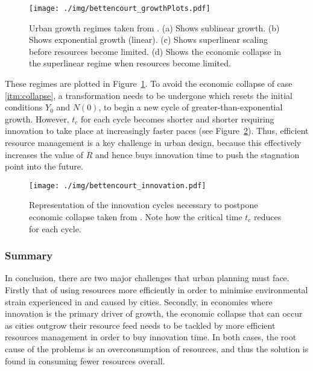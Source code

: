 \begin{figure}[h!]
	\centering
	\texttt{[image: ./img/bettencourt\_growthPlots.pdf]} 
	\caption{Urban growth regimes taken from \citet{Bettencourt2007}. (a) Shows sublinear growth. (b) Shows exponential growth (linear). (c) Shows superlinear scaling before resources become limited. (d) Shows the economic collapse in the superlinear regime when resources become limited.} \label{fig:bettencourt_growth}
\end{figure}
These regimes are plotted in Figure~\ref{fig:bettencourt_growth}. To avoid the economic collapse of case \eqref{itm:collapse}, a transformation needs to be undergone which resets the initial conditions $Y_0$ and $N(0)$, to begin a new cycle of greater-than-exponential growth. However, $t_c$ for each cycle becomes shorter and shorter requiring innovation to take place at increasingly faster paces (see Figure~\ref{fig:bettencourt_innovation}). Thus, efficient resource management is a key challenge in urban design, because this effectively increases the value of $R$ and hence buys innovation time to push the stagnation point into the future.

\begin{figure}[h!]
	\centering
	\texttt{[image: ./img/bettencourt\_innovation.pdf]} 
	\caption{Representation of the innovation cycles necessary to postpone economic collapse taken from \citet{Bettencourt2007}. Note how the critical time $t_c$ reduces for each cycle.} \label{fig:bettencourt_innovation}
\end{figure}

\subsubsection*{Summary}
In conclusion, there are two major challenges that urban planning must face. Firstly that of using resources more efficiently in order to minimise environmental strain experienced in and caused by cities. Secondly, in economies where innovation is the primary driver of growth, the economic collapse that can occur as cities outgrow their resource feed needs to be tackled by more efficient resources management in order to buy innovation time. In both cases, the root cause of the problems is an overconsumption of resources, and thus the solution is found in consuming fewer resources overall.

